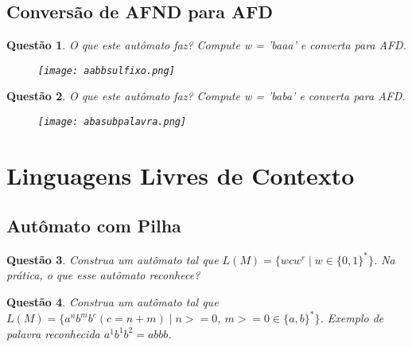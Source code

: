 \documentclass{article}
\newtheorem{problem}{Questão}
\begin{document}
    \subsection{Conversão de AFND para AFD}

    \begin{problem}
                O que este autômato faz? Compute w = 'baaa' e converta para AFD.
                  \begin{figure}[!htb]
                      \centering
                      \texttt{[image: aabbsulfixo.png]}
                  \end{figure}
    \end{problem}
    \begin{solution}
        
    \end{solution}
     \begin{problem}
         O que este autômato faz? Compute w = 'baba' e 
         converta para AFD.
                \begin{figure}[!htb]
                    \centering
                    \texttt{[image: abasubpalavra.png]}
                \end{figure}
    \end{problem}
\begin{solution}
        
    \end{solution}
\section{Linguagens Livres de Contexto}

    \subsection{Autômato com Pilha}
    
    \begin{problem}
         Construa um autômato tal que $L(M) = \{ wcw^r \mid w \in \{0,1\}^*\}$. Na prática, o que esse autômato reconhece?
    \end{problem}
    \begin{solution}
        
    \end{solution}
    \begin{problem}
         Construa um autômato tal que $L(M) = \{ a^n b^m b^c (c = n + m)\mid n>=0$, $m>=0 \in \{a,b\}^*\}$. Exemplo de palavra reconhecida $a^1 b^1 b^2 = abbb$.
    \end{problem}
    \begin{solution}
        
    \end{solution}
\end{document}
